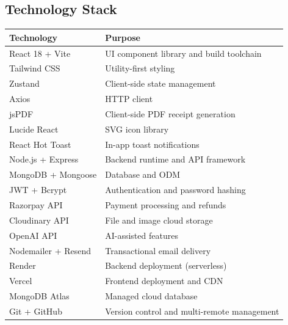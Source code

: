 \documentclass[11pt,a4paper]{article}
\begin{document}
\begin{itemize}
{\newpage

\section{Technology Stack}

\begin{table}[h!]
\centering
\begin{tabularx}{\textwidth}{l X}
\toprule
\textbf{Technology} & \textbf{Purpose} \\
\midrule
React 18 + Vite         & UI component library and build toolchain \\
Tailwind CSS            & Utility-first styling \\
Zustand                 & Client-side state management \\
Axios                   & HTTP client \\
jsPDF                   & Client-side PDF receipt generation \\
Lucide React            & SVG icon library \\
React Hot Toast         & In-app toast notifications \\
Node.js + Express       & Backend runtime and API framework \\
MongoDB + Mongoose      & Database and ODM \\
JWT + Bcrypt            & Authentication and password hashing \\
Razorpay API            & Payment processing and refunds \\
Cloudinary API          & File and image cloud storage \\
OpenAI API              & AI-assisted features \\
Nodemailer + Resend     & Transactional email delivery \\
Render                  & Backend deployment (serverless) \\
Vercel                  & Frontend deployment and CDN \\
MongoDB Atlas           & Managed cloud database \\
Git + GitHub            & Version control and multi-remote management \\
\bottomrule
\end{tabularx}
\end{table}

\newpage

}
\end{itemize}
\end{document}
